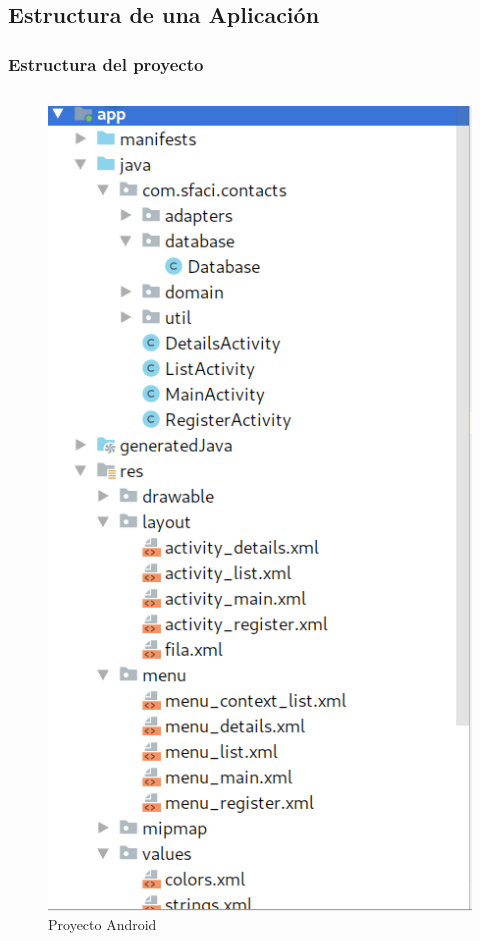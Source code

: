 \documentclass[xcolor={dvipsnames}]{beamer}
\begin{document}
\subsection{Estructura de una Aplicación}
\begin{frame}\frametitle{Estructura del proyecto}
    \begin{columns}
        \begin{column}{4cm}
        \begin{figure}
        \includegraphics[scale=0.7]{images/project_structure} 
        \caption{Proyecto Android}
        \end{figure}
        \end{column}

\end{columns}
\end{frame}
\end{document}
